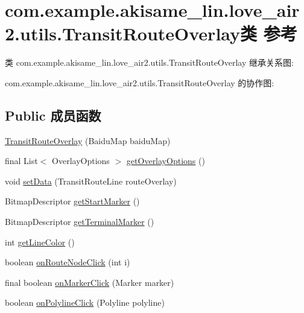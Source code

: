 \hypertarget{classcom_1_1example_1_1akisame__lin_1_1love__air2_1_1utils_1_1_transit_route_overlay}{}\section{com.\+example.\+akisame\+\_\+lin.\+love\+\_\+air2.\+utils.\+Transit\+Route\+Overlay类 参考}
\label{classcom_1_1example_1_1akisame__lin_1_1love__air2_1_1utils_1_1_transit_route_overlay}


类 com.\+example.\+akisame\+\_\+lin.\+love\+\_\+air2.\+utils.\+Transit\+Route\+Overlay 继承关系图\+:


com.\+example.\+akisame\+\_\+lin.\+love\+\_\+air2.\+utils.\+Transit\+Route\+Overlay 的协作图\+:
\subsection*{Public 成员函数}
\begin{DoxyCompactItemize}
\item 
\mbox{\hyperlink{classcom_1_1example_1_1akisame__lin_1_1love__air2_1_1utils_1_1_transit_route_overlay_ade510d1e98c952e6f727e61fe05d5cea}{Transit\+Route\+Overlay}} (Baidu\+Map baidu\+Map)
\item 
final List$<$ Overlay\+Options $>$ \mbox{\hyperlink{classcom_1_1example_1_1akisame__lin_1_1love__air2_1_1utils_1_1_transit_route_overlay_aba73bc8e4d60a3f1208e68d78c05b955}{get\+Overlay\+Options}} ()
\item 
void \mbox{\hyperlink{classcom_1_1example_1_1akisame__lin_1_1love__air2_1_1utils_1_1_transit_route_overlay_a8e67aa989fac5f6a75bd9955a67879ec}{set\+Data}} (Transit\+Route\+Line route\+Overlay)
\item 
Bitmap\+Descriptor \mbox{\hyperlink{classcom_1_1example_1_1akisame__lin_1_1love__air2_1_1utils_1_1_transit_route_overlay_a1cdbf1bbe11cd3dd4a1678250cc015fd}{get\+Start\+Marker}} ()
\item 
Bitmap\+Descriptor \mbox{\hyperlink{classcom_1_1example_1_1akisame__lin_1_1love__air2_1_1utils_1_1_transit_route_overlay_af2b882531defd4b75bb1a46c3f1dc891}{get\+Terminal\+Marker}} ()
\item 
int \mbox{\hyperlink{classcom_1_1example_1_1akisame__lin_1_1love__air2_1_1utils_1_1_transit_route_overlay_ae22fae63264216455a4b9a5a5201655f}{get\+Line\+Color}} ()
\item 
boolean \mbox{\hyperlink{classcom_1_1example_1_1akisame__lin_1_1love__air2_1_1utils_1_1_transit_route_overlay_ae2da017d71072bbef3c78f5e80e9b6ee}{on\+Route\+Node\+Click}} (int i)
\item 
final boolean \mbox{\hyperlink{classcom_1_1example_1_1akisame__lin_1_1love__air2_1_1utils_1_1_transit_route_overlay_ab628b1ab3c01d0f63163b6decdb233fe}{on\+Marker\+Click}} (Marker marker)
\item 
boolean \mbox{\hyperlink{classcom_1_1example_1_1akisame__lin_1_1love__air2_1_1utils_1_1_transit_route_overlay_ad79918494731b226eb02bd89da111b52}{on\+Polyline\+Click}} (Polyline polyline)
\end{DoxyCompactItemize}
